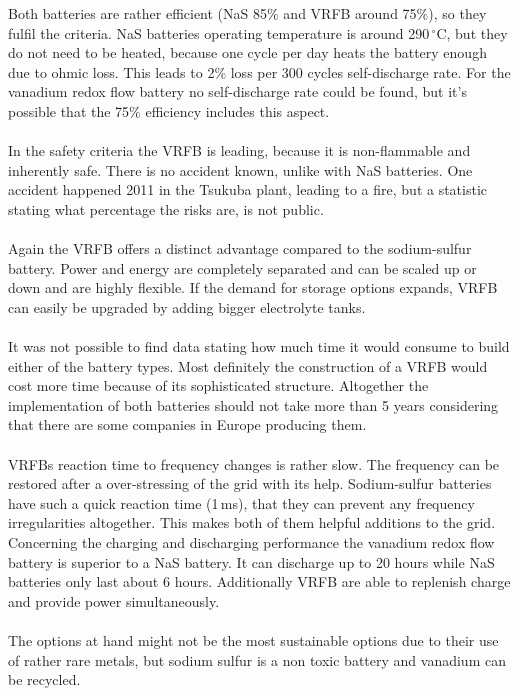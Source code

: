 \begin{parcolumns}[colwidths={1=2.5 cm, 2=10 cm, 3=2.5cm}]{3}
{Both batteries are rather efficient (NaS 85$\%$ and VRFB around 75$\%$), so they fulfil the criteria.
NaS batteries operating temperature is around 290\,$^\circ$C, but they do not need to be heated, because one cycle per day heats the battery enough due to ohmic loss. This leads to 2$\%$ loss per 300 cycles self-discharge rate. For the vanadium redox flow battery no self-discharge rate could be found, but it's possible that the 75$\%$ efficiency includes this aspect.\\\\
In the safety criteria the VRFB is leading, because it is non-flammable and inherently safe. There is no accident known, unlike with NaS batteries. One accident happened 2011 in the Tsukuba plant, leading to a fire, but a statistic stating what percentage the risks are, is not public. \\\\
Again the VRFB offers a distinct advantage compared to the sodium-sulfur battery. Power and energy are completely separated and can be scaled up or down and are highly flexible. If the demand for storage options expands, VRFB can easily be upgraded by adding bigger electrolyte tanks.\\\\
It was not possible to find data stating how much time it would consume to build either of the battery types. Most definitely the construction of a VRFB would cost more time because of its sophisticated structure. Altogether the implementation of both batteries should not take more than 5 years considering that there are some companies in Europe producing them.\\\\
VRFBs reaction time to frequency changes is rather slow. The frequency can be restored after a over-stressing of the grid with its help. Sodium-sulfur batteries have such a quick reaction time (1\,ms), that they can prevent any frequency irregularities altogether. This makes both of them helpful additions to the grid. Concerning the charging and discharging performance the vanadium redox flow battery is superior to a NaS battery. It can discharge up to 20 hours while NaS batteries only last about 6 hours. Additionally VRFB are able to replenish charge and provide power simultaneously.\\\\ 
The options at hand might not be the most sustainable options due to their use of rather rare metals, but sodium sulfur is a non toxic battery and vanadium can be recycled.\\\\
}
\end{parcolumns}
